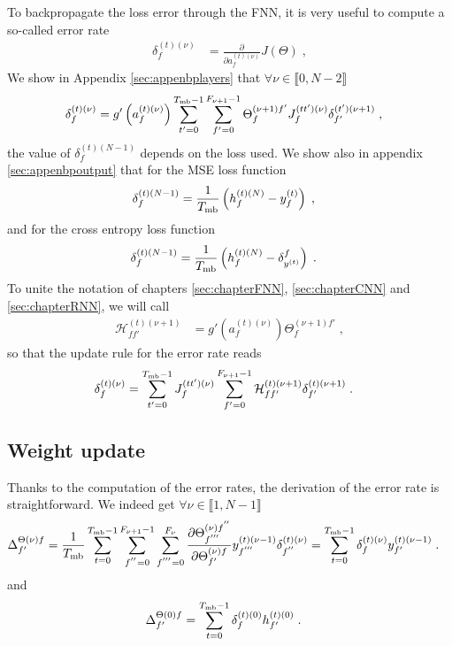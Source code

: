 To backpropagate the loss error through the FNN, it is very useful to compute a so-called error rate
\begin{align}
\delta^{(t)(\nu)}_f&= \frac{\partial }{\partial a_{f}^{(t)(\nu)}}J(\Theta)\;,
\end{align}
We show in Appendix \ref{sec:appenbplayers} that $\forall \nu \in \llbracket 0,N-2\rrbracket$
\begin{align}
\delta^{(t)(\nu)}_f&=g'\left(a_{f}^{(t)(\nu)}\right)
%
\sum_{t'=0}^{T_{{\rm mb}}-1}\sum_{f'=0}^{F_{\nu+1}-1}\Theta^{(\nu+1)f'}_{f}J^{(tt')(\nu)}_{f} \delta^{(t')(\nu+1)}_{f'}\;,
\end{align}
the value of $\delta^{(t)(N-1)}_f$ depends on the loss used. We show also in appendix \ref{sec:appenbpoutput} that for the MSE loss function
\begin{align}
\delta^{(t)(N-1)}_f&= \frac{1}{T_{{\rm mb}}}\left(h_{f}^{(t)(N)}-y_f^{(t)}\right)\;,
\end{align}
and for the cross entropy loss function
\begin{align}
\delta^{(t)(N-1)}_{f}&= \frac{1}{T_{{\rm mb}}}\left(h_{f}^{(t)(N)}-\delta^f_{y^{(t)}}\right)\;.
\end{align}
To unite the notation of chapters \ref{sec:chapterFNN}, \ref{sec:chapterCNN} and \ref{sec:chapterRNN}, we will call
\begin{align}
\mathcal{H}^{(t)(\nu+1)}_{ff'}&=g'\left(a_{f}^{(t)(\nu)}\right)\Theta^{(\nu+1)f'}_{f}\;,
\end{align}
so that the update rule for the error rate reads
\begin{align}
\delta^{(t)(\nu)}_f&=
%
\sum_{t'=0}^{T_{{\rm mb}}-1}J^{(tt')(\nu)}_{f}\sum_{f'=0}^{F_{\nu+1}-1}\mathcal{H}^{(t)(\nu+1)}_{ff'} \delta^{(t)(\nu+1)}_{f'}\;.
\end{align}

\subsection{Weight update}

Thanks to the computation of the error rates, the derivation of the error rate is straightforward. We indeed get $\forall \nu \in \llbracket 1,N-1\rrbracket$
\begin{align}
\Delta^{\Theta(\nu)f}_{f'}&=\frac{1}{T_{{\rm mb}}}\sum_{t=0}^{T_{{\rm mb}}-1}
%
\sum^{F_{\nu+1}-1}_{f^{''}=0}\sum^{F_\nu}_{f^{'''}=0}\frac{\partial\Theta^{(\nu)f^{''}}_{f^{'''}}
%
}{\partial \Theta^{(\nu)f}_{f'}}y^{(t)(\nu-1)}_{f^{'''}}\delta^{(t)(\nu)}_{f^{''}}
%
=\sum_{t=0}^{T_{{\rm mb}}-1}\delta^{(t)(\nu)}_f y^{(t)(\nu-1)}_{f'}\;.
\end{align}
and
\begin{align}
\Delta^{\Theta(0)f}_{f'}&=\sum_{t=0}^{T_{{\rm mb}}-1}\delta^{(t)(0)}_f h^{(t)(0)}_{f'}\;.
\end{align}

